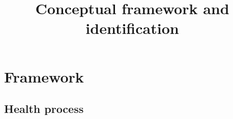 \documentclass[11pt]{article}
\title{Conceptual framework and identification}
\theoremstyle{remark}
\begin{document}
\maketitle

%

\section{Framework}

\subsection{Health process}
\end{document}
